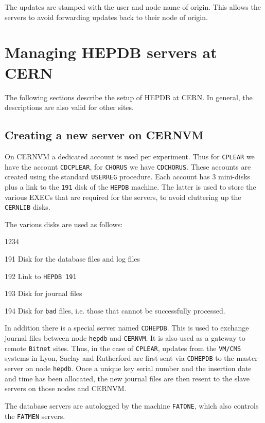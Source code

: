 The updates are stamped with the user and node name of origin. This
allows the servers to avoid forwarding updates back to their node
of origin.

\chapter{Managing HEPDB servers at CERN}
\label{CERN-servers}

The following sections describe the setup of HEPDB at CERN.
In general, the descriptions are also valid for other sites.

\section{Creating a new server on CERNVM}

On CERNVM a dedicated account is used per experiment.
Thus for {\tt CPLEAR} we have the account {\tt CDCPLEAR},
for {\tt CHORUS} we have {\tt CDCHORUS}. These accounts
are created using the standard {\tt USERREG} procedure.
Each account has 3 mini-disks plus a link to the {\tt 191}
disk of the {\tt HEPDB} machine. The latter is used to
store the various EXECs that are required for the servers,
to avoid cluttering up the {\tt CERNLIB} disks.

The various disks are used as follows:
\begin{DLtt}{1234}
\item[191]Disk for the database files and log files
\item[192]Link to {\tt HEPDB 191}
\item[193]Disk for journal files
\item[194]Disk for {\tt bad} files, i.e. those that
cannot be successfully processed.
\end{DLtt}

In addition there is a special server named {\tt CDHEPDB}.
This is used to exchange journal files between node {\tt hepdb}
and {\tt CERNVM}. It is also used as a gateway to remote {\tt Bitnet}
sites. Thus, in the case of {\tt CPLEAR}, updates from the
{\tt VM/CMS} systems in Lyon, Saclay and Rutherford are first
sent via {\tt CDHEPDB} to the master server on node {\tt hepdb}.
Once a unique key serial number and the insertion date and time
has been allocated, the new journal files are then resent
to the slave servers on those nodes and CERNVM.

The database servers are autologged by the machine {\tt FATONE},
which also controls the {\tt FATMEN} servers.

